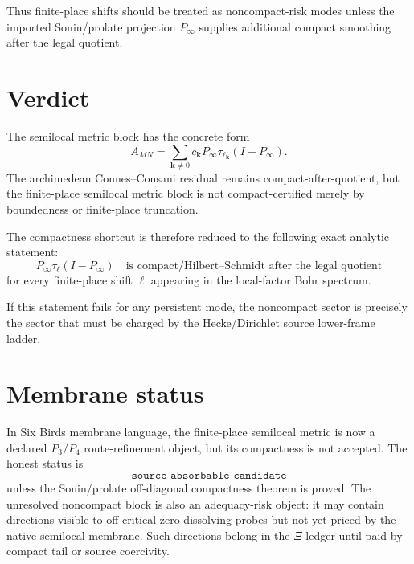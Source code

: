\documentclass[11pt]{article}
\begin{document}
Thus finite-place shifts should be treated as noncompact-risk modes unless
the imported Sonin/prolate projection \(P_\infty\) supplies additional
compact smoothing after the legal quotient.

\section{Verdict}

The semilocal metric block has the concrete form
\[
  A_{MN}
  =
  \sum_{\mathbf k\ne0}c_{\mathbf k}
  P_\infty\tau_{\ell_{\mathbf k}}(I-P_\infty).
\]
The archimedean Connes--Consani residual remains compact-after-quotient, but
the finite-place semilocal metric block is not compact-certified merely by
boundedness or finite-place truncation.

The compactness shortcut is therefore reduced to the following exact analytic
statement:
\[
  P_\infty\tau_{\ell}(I-P_\infty)
  \quad\text{is compact/Hilbert--Schmidt after the legal quotient}
\]
for every finite-place shift \(\ell\) appearing in the local-factor Bohr
spectrum.

If this statement fails for any persistent mode, the noncompact sector is
precisely the sector that must be charged by the Hecke/Dirichlet source
lower-frame ladder.

\section{Membrane status}

In Six Birds membrane language, the finite-place semilocal metric is now a
declared \(P_3/P_4\) route-refinement object, but its compactness is not
accepted.  The honest status is
\[
  \texttt{source\_absorbable\_candidate}
\]
unless the Sonin/prolate off-diagonal compactness theorem is proved.  The
unresolved noncompact block is also an adequacy-risk object: it may contain
directions visible to off-critical-zero dissolving probes but not yet priced by
the native semilocal membrane.  Such directions belong in the \(\Xi\)-ledger
until paid by compact tail or source coercivity.
\end{document}
